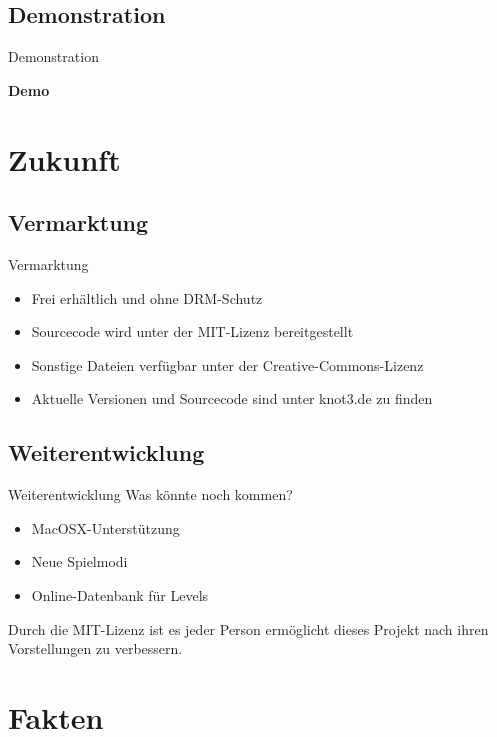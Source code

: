 \documentclass[18pt]{beamer}
\begin{document}
\subsection{Demonstration}
\begin{frame}{Demonstration}
\begin{center}
\Huge \textbf{Demo}
\end{center}

\end{frame}





\section{Zukunft}
\subsection{Vermarktung}
\begin{frame}{Vermarktung}
\begin{itemize}
\item Frei erhältlich und ohne DRM-Schutz
\item Sourcecode wird unter der MIT-Lizenz bereitgestellt
\item Sonstige Dateien verfügbar unter der Creative-Commons-Lizenz
\item Aktuelle Versionen und Sourcecode sind unter knot3.de zu finden

\end{itemize}
\end{frame}

\subsection{Weiterentwicklung}
\begin{frame}{Weiterentwicklung}
Was könnte noch kommen?
\begin{itemize}
\item MacOSX-Unterstützung 
\item Neue Spielmodi
\item Online-Datenbank für Levels
\end{itemize}

Durch die MIT-Lizenz ist es jeder Person ermöglicht dieses Projekt nach ihren Vorstellungen zu verbessern.
\end{frame}

\section{Fakten}
\end{document}

